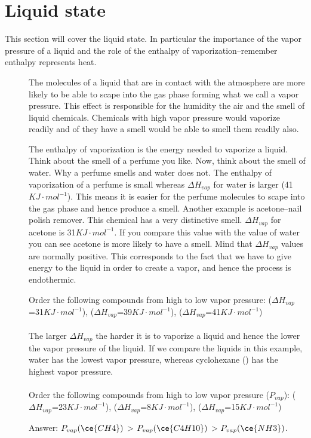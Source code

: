 \documentclass[main.tex]{subfiles}
\begin{document}
\section{Liquid state}
This section will cover the liquid state. In particular the importance of the vapor pressure of a liquid and the role of the enthalpy of vaporization--remember enthalpy represents heat.
\sloppy 
\begin{description}
\item[] The molecules of a liquid that are in contact with the atmosphere are more likely to be able to scape into the gas phase forming what we call a vapor pressure. This effect is responsible for the humidity the air and the smell of liquid chemicals. Chemicals with high vapor pressure would vaporize readily and of they have a smell would be able to smell them readily also.
\item[] The enthalpy of vaporization is the energy needed to vaporize a liquid. Think about the smell of a perfume you like. Now, think about the smell of water. Why a perfume smells and water does not. The enthalpy of vaporization of a perfume is small whereas  $\Delta H_{vap}$ for water is larger (41$KJ\cdot mol^{-1}$). This means it is easier for the perfume molecules to scape into the gas phase and hence produce a smell. Another example is acetone--nail polish remover. This chemical has a very distinctive smell. $\Delta H_{vap}$ for acetone is 31$KJ\cdot mol^{-1}$. If you compare this value with the value of water you can see acetone is more likely to have a smell. Mind that $\Delta H_{vap}$ values are normally positive. This corresponds to the fact that we have to give energy to the liquid in order to create a vapor, and hence the process is endothermic.


\begin{example} %
Order the following compounds from high to low vapor pressure:  ($\Delta H_{vap}$=31$KJ\cdot mol^{-1}$),  ($\Delta H_{vap}$=39$KJ\cdot mol^{-1}$),  ($\Delta H_{vap}$=41$KJ\cdot mol^{-1}$)
\\
\\
The larger $\Delta H_{vap}$ the harder it is to vaporize a liquid and hence the lower the vapor pressure of the liquid. If we compare the liquids in this example, water has the lowest vapor pressure, whereas cyclohexane () has the highest vapor pressure.
\\
\faDiamond\ \\
Order the following compounds from high to low vapor pressure ($P_{vap}$):  ($\Delta H_{vap}$=23$KJ\cdot mol^{-1}$),  ($\Delta H_{vap}$=8$KJ\cdot mol^{-1}$),  ($\Delta H_{vap}$=15$KJ\cdot mol^{-1}$)
\begin{flushright} Answer: $P_{vap}(\ce{CH4})$ > $P_{vap}(\ce{C4H10})$ > $P_{vap}(\ce{NH3})$.   \end{flushright}
\end{example}%



\end{description}
\end{document}
